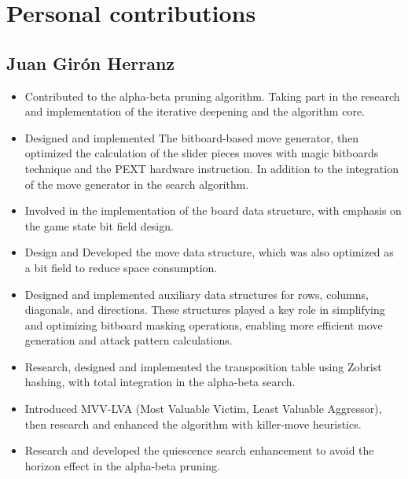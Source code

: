 \chapter*{Personal contributions}
\label{cap:contribucionesPersonales}

\section*{Juan Girón Herranz}

\begin{itemize}

    \item Contributed to the alpha-beta pruning algorithm. Taking part in the research and implementation of the iterative deepening and the algorithm core.

    \item Designed and implemented The bitboard-based move generator, then optimized the calculation of the slider pieces moves with magic bitboards technique and the PEXT hardware instruction. In addition to the integration of the move generator in the search algorithm.

    \item Involved in the implementation of the board data structure, with emphasis on the game state bit field design.

    \item Design and Developed the move data structure, which was also optimized as a bit field to reduce space consumption.    

    \item Designed and implemented auxiliary data structures for rows, columns, diagonals, and directions. These structures played a key role in simplifying and optimizing bitboard masking operations, enabling more efficient move generation and attack pattern calculations.
    
    \item Research, designed and implemented the transposition table using Zobrist hashing, with total integration in the alpha-beta search.

    \item Introduced MVV-LVA (Most Valuable Victim, Least Valuable Aggressor), then research and enhanced the algorithm with killer-move heuristics.

    \item Research and developed the quiescence search enhancement to avoid the horizon effect in the alpha-beta pruning.


\end{itemize}
